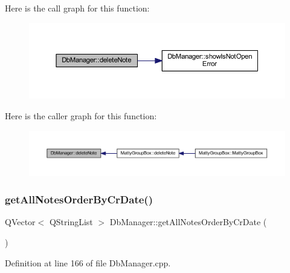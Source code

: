 Here is the call graph for this function\+:
\nopagebreak
\begin{figure}[H]
\begin{center}
\leavevmode
\includegraphics[width=350pt]{classDbManager_a164849758fd05445c7af2cc04fc3569f_cgraph}
\end{center}
\end{figure}
Here is the caller graph for this function\+:
\nopagebreak
\begin{figure}[H]
\begin{center}
\leavevmode
\includegraphics[width=350pt]{classDbManager_a164849758fd05445c7af2cc04fc3569f_icgraph}
\end{center}
\end{figure}
\hypertarget{classDbManager_a9b35a902ca6a35cd2589a3d1fffda94b}{}\label{classDbManager_a9b35a902ca6a35cd2589a3d1fffda94b} 
\subsubsection{\texorpdfstring{get\+All\+Notes\+Order\+By\+Cr\+Date()}{getAllNotesOrderByCrDate()}}
{\footnotesize\ttfamily Q\+Vector$<$ Q\+String\+List $>$ Db\+Manager\+::get\+All\+Notes\+Order\+By\+Cr\+Date (\begin{DoxyParamCaption}{ }\end{DoxyParamCaption})\hspace{0.3cm}{\ttfamily [static]}}



Definition at line 166 of file Db\+Manager.\+cpp.

